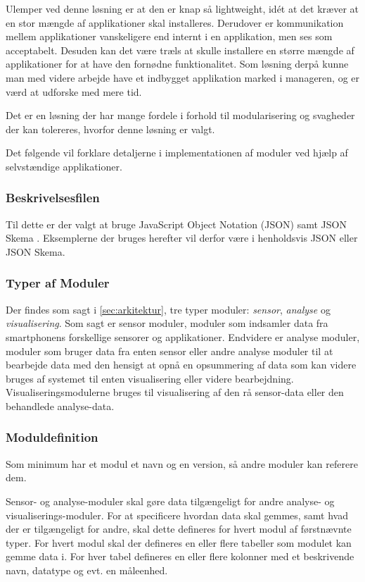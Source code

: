 Ulemper ved denne løsning er at den er knap så lightweight, idét at det kræver at en stor mængde af applikationer skal installeres.
Derudover er kommunikation mellem applikationer vanskeligere end internt i en applikation, men ses som acceptabelt.
Desuden kan det være træls at skulle installere en større mængde af applikationer for at have den fornødne funktionalitet.
Som løsning derpå kunne man med videre arbejde have et indbygget applikation marked i manageren, og er værd at udforske med mere tid.

Det er en løsning der har mange fordele i forhold til modularisering og svagheder der kan tolereres, hvorfor denne løsning er valgt. 

Det følgende vil forklare detaljerne i implementationen af moduler ved hjælp af selvstændige applikationer.

\subsubsection{Beskrivelsesfilen}

Til dette er der valgt at bruge JavaScript Object Notation (JSON) samt JSON Skema \citep{jsonpojo}.
Eksemplerne der bruges herefter vil derfor være i henholdsvis JSON eller JSON Skema.

\subsubsection{Typer af Moduler}
Der findes som sagt i \cref{sec:arkitektur}, tre typer moduler: \textit{sensor}, \textit{analyse} og \textit{visualisering}.
Som sagt er sensor moduler, moduler som indsamler data fra smartphonens forskellige sensorer og applikationer.
Endvidere er analyse moduler, moduler som bruger data fra enten sensor eller andre analyse moduler til at bearbejde data med den hensigt at opnå en opsummering af data som kan videre bruges af systemet til enten visualisering eller videre bearbejdning.
Visualiseringsmodulerne bruges til visualisering af den rå sensor-data eller den behandlede analyse-data.

\subsubsection{Moduldefinition}
Som minimum har et modul et navn og en version, så andre moduler kan referere dem.

Sensor- og analyse-moduler skal gøre data tilgængeligt for andre analyse- og visualiserings-moduler.
For at specificere hvordan data skal gemmes, samt hvad der er tilgængeligt for andre, skal dette defineres for hvert modul af førstnævnte typer.
For hvert modul skal der defineres en eller flere tabeller som modulet kan gemme data i.
For hver tabel defineres en eller flere kolonner med et beskrivende navn, datatype og evt. en måleenhed.

